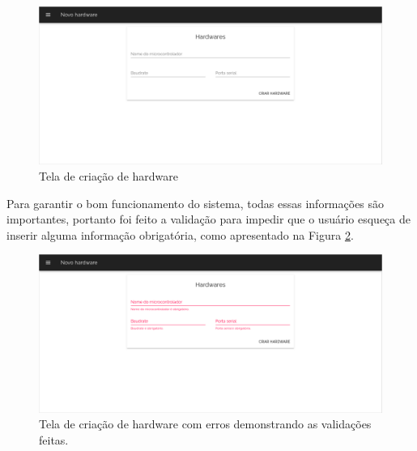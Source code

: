 \begin{figure}[h!]
	\centering
		\includegraphics[keepaspectratio=true,scale=0.33]{figuras/telas_software/2.png}
	\caption{Tela de criação de hardware}
	\label{fig:cria_hardware}
\end{figure}

Para garantir o bom funcionamento do sistema, todas essas informações são importantes, portanto foi feito a validação para impedir que o usuário esqueça de inserir alguma informação obrigatória, como apresentado na Figura \ref{fig:cria_hardware_error}.

\begin{figure}[h!]
	\centering
		\includegraphics[keepaspectratio=true,scale=0.33]{figuras/telas_software/2-error.png}
	\caption{Tela de criação de hardware com erros demonstrando as validações feitas.}
	\label{fig:cria_hardware_error}
\end{figure}

